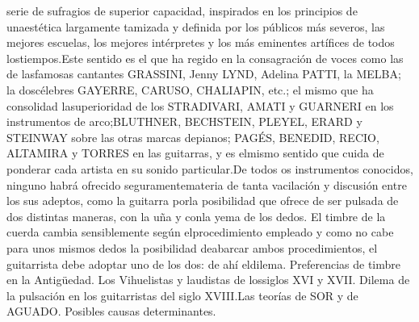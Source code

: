 \documentclass[
11pt, %
a4paper, %
oneside, %
headinclude,footinclude, %
BCOR5mm, %
]{scrartcl}
\begin{document}
{serie de sufragios de superior capacidad, inspirados en los principios de unaestética largamente tamizada y definida por los públicos más severos, las mejores escuelas, los mejores intérpretes y los más eminentes artífices de todos lostiempos.Este sentido es el que ha regido en la consagración de voces como las de lasfamosas cantantes GRASSINI, Jenny LYND, Adelina PATTI, la MELBA; la doscélebres GAYERRE, CARUSO, CHALIAPIN, etc.; el mismo que ha consolidad lasuperioridad de los STRADIVARI, AMATI y GUARNERI en los instrumentos de arco;BLUTHNER, BECHSTEIN, PLEYEL, ERARD y STEINWAY sobre las otras marcas depianos; PAGÉS, BENEDID, RECIO, ALTAMIRA y TORRES en las guitarras, y es elmismo sentido que cuida de ponderar cada artista en su sonido particular.De todos os instrumentos conocidos, ninguno habrá ofrecido seguramentemateria de tanta vacilación y discusión entre los sus adeptos, como la guitarra porla posibilidad que ofrece de ser pulsada de dos distintas maneras, con la uña y conla yema de los dedos. El timbre de la cuerda cambia sensiblemente según elprocedimiento empleado y como no cabe para unos mismos dedos la posibilidad deabarcar ambos procedimientos, el guitarrista debe adoptar uno de los dos: de ahí eldilema. 
Preferencias de timbre en la Antigüedad. Los Vihuelistas y laudistas de lossiglos XVI y XVII. Dilema de la pulsación en los guitarristas del siglo XVIII.Las teorías de SOR y de AGUADO. Posibles causas determinantes.
}
\end{document}
